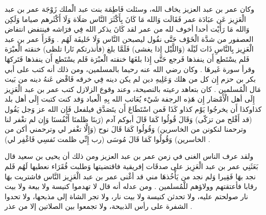 وكان عمر بن عبد العزيز يخاف الله، وسئلت فَاطِمَة بنت عبد الْملك زَوْجَة عمر بن عبد الْعَزِيز عَن عبَادَة عمر فَقَالَت وَالله مَا كَانَ بِأَكْثَرَ النَّاس صَلَاة وَلَا أَكْثَرهم صياما وَلَكِن وَالله مَا رَأَيْت أحدا أخوف لله من عمر لقد كَانَ يذكر الله فِي فرَاشه فينتفض انتفاض العصفور من شدَّة الْخَوْف حَتَّى نقُول ليصبحن النَّاس وَلَا خَليفَة لَهُم \cite{ibnAbdAlHakam_OmarIbnAbdAlAziz}. وَقَرَأَ عمر بن عبد الْعَزِيز بِالنَّاسِ ذَات لَيْلَة (وَاللَّيْل إِذا يغشى) فَلَمَّا بلغ (فأنذرتكم نَارا تلظى) خنقته الْعبْرَة فَلم يسْتَطع أَن ينفذها فَرجع حَتَّى إِذا بلغَهَا خنقته الْعبْرَة فَلم يسْتَطع أَن ينفذها فَتَركهَا وقرأ سورة غَيرهَا \cite{ibnAbdAlHakam_OmarIbnAbdAlAziz}. وكان رضي الله عنه رحيما بالمسلمين، ومن ذلك أنه كتب على أبي بكر بن حزم إِن كل من هلك وَعَلِيهِ دين لم يكن دينه فِي خرقه فَاقْض عَنهُ دينه من بَيت مَال الْمُسلمين \cite{ibnAbdAlHakam_OmarIbnAbdAlAziz}. كان بتعاهد رعيته بالنصيحة، وعند وقوع الزلازل كتب عمر بن عبد الْعَزِيز إِلَى أهل الْأَمْصَار إِن هَذِه الرجفة شَيْء يُعَاتب الله بِهِ الْعباد وَقد كنت كتبت إِلَى أهل بلد كذاوكذا أَن يخرجُوا يَوْم كذاو كَذَا فَمن اسْتَطَاعَ أَن يتَصَدَّق فيلفعل فَإِن الله عز وَجل يَقُول (قد أَفْلح من تزكّى) وَقَالَ قُولُوا كَمَا قَالَ أبوكم آدم (رَبنَا ظلمنَا أَنْفُسنَا وَإِن لم تغْفر لنا وترحمنا لنكونن من الخاسرين) وَقُولُوا كَمَا قَالَ نوح (وَإِلَّا تغْفر لي وترحمني أكن من الخاسرين) وَقُولُوا كَمَا قَالَ مُوسَى (رب إِنِّي ظلمت نَفسِي فَاغْفِر لي) \cite{ibnAbdAlHakam_OmarIbnAbdAlAziz}.

ولقد عرف الناس الغنى في زمن عمر بن عبد العزيز ومن ذلك أن يحيى بن سعيد قال بَعَثَنِي عمر بن عبد الْعَزِيز على صدقَات إفريقية فاقتضيتها وَطلبت فُقَرَاء نعطيها لَهُم فَلم نجد بهَا فَقِيرا وَلم نجد من يَأْخُذهَا مني قد أغْنى عمر بن عبد الْعَزِيز النَّاس فاشتريت بهَا رقابا فأعتقتهم وولاؤهم للْمُسلمين \cite{ibnAbdAlHakam_OmarIbnAbdAlAziz}. ومن عدله أنه قال لا تهدموا كنيسة ولا بيعة ولا بيت نار صولحتم عليه، ولا تحدثن كنيسة ولا بيت نار، ولا تجر الشاة إلى مذبحها، ولا تحدوا الشفرة على رأس الذبيحة، ولا تجمعوا بين الصلاتين إلا من عذر \cite{ibnJareerTabari_Tareekh}. 


